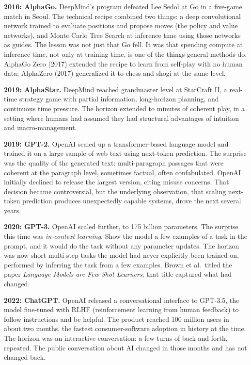\textbf{2016: AlphaGo.} DeepMind's program defeated Lee Sedol at Go in a five-game match in Seoul. The technical recipe combined two things: a deep convolutional network trained to evaluate positions and propose moves (the policy and value networks), and Monte Carlo Tree Search at inference time using those networks as guides. The lesson was not just that Go fell. It was that spending compute at inference time, not only at training time, is one of the things general methods do. AlphaGo Zero (2017) extended the recipe to learn from self-play with no human data; AlphaZero (2017) generalized it to chess and shogi at the same level.

\textbf{2019: AlphaStar.} DeepMind reached grandmaster level at StarCraft II, a real-time strategy game with partial information, long-horizon planning, and continuous time pressure. The horizon extended to minutes of coherent play, in a setting where humans had assumed they had structural advantages of intuition and macro-management.

\textbf{2019: GPT-2.} OpenAI scaled up a transformer-based language model and trained it on a large sample of web text using next-token prediction. The surprise was the quality of the generated text: multi-paragraph passages that were coherent at the paragraph level, sometimes factual, often confabulated. OpenAI initially declined to release the largest version, citing misuse concerns. That decision became controversial, but the underlying observation, that scaling next-token prediction produces unexpectedly capable systems, drove the next several years.

\textbf{2020: GPT-3.} OpenAI scaled further, to 175 billion parameters. The surprise this time was \emph{in-context learning}. Show the model a few examples of a task in the prompt, and it would do the task without any parameter updates. The horizon was now short multi-step tasks the model had never explicitly been trained on, performed by inferring the task from a few examples. Brown et al.\ titled the paper \textit{Language Models are Few-Shot Learners}; that title captured what had changed.

\textbf{2022: ChatGPT.} OpenAI released a conversational interface to GPT-3.5, the model fine-tuned with RLHF (reinforcement learning from human feedback) to follow instructions and be helpful. The product reached 100 million users in about two months, the fastest consumer-software adoption in history at the time. The horizon was an interactive conversation: a few turns of back-and-forth, repeated. The public conversation about AI changed in those months and has not changed back.

